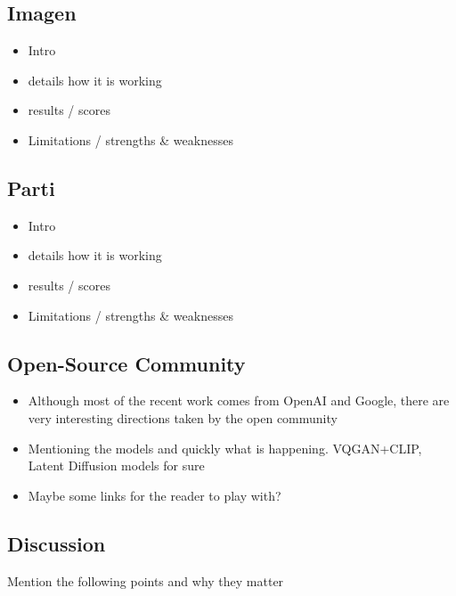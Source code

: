 \documentclass[
]{krantz}
\providecommand{\tightlist}{%
  \setlength{\itemsep}{0pt}\setlength{\parskip}{0pt}}
\begin{document}
\hypertarget{imagen}{%
\subsection{Imagen}\label{imagen}}

\begin{itemize}
\tightlist
\item
  Intro
\item
  details how it is working
\item
  results / scores
\item
  Limitations / strengths \& weaknesses
\end{itemize}

\hypertarget{parti}{%
\subsection{Parti}\label{parti}}

\begin{itemize}
\tightlist
\item
  Intro
\item
  details how it is working
\item
  results / scores
\item
  Limitations / strengths \& weaknesses
\end{itemize}

\hypertarget{open-source-community}{%
\subsection{Open-Source Community}\label{open-source-community}}

\begin{itemize}
\tightlist
\item
  Although most of the recent work comes from OpenAI and Google, there are very interesting directions taken by the open community
\item
  Mentioning the models and quickly what is happening. VQGAN+CLIP, Latent Diffusion models for sure
\item
  Maybe some links for the reader to play with?
\end{itemize}

\hypertarget{discussion}{%
\subsection{Discussion}\label{discussion}}

Mention the following points and why they matter
\end{document}
